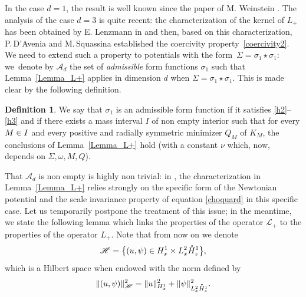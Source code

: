 \documentclass[10pt]{amsart}
\theoremstyle{definition}
\newtheorem{defin}[lemma]{Definition}
\newcommand*{\overbigdot}[1]{%
\accentset{\mbox{\large\bfseries .}}{#1}}
\begin{document}
In the case $d=1$, the result is well known since the paper of M. Weinstein \cite{Weinstein1}. The analysis of the case $d=3$ is quite recent: the characterization of the kernel of $L_{+}$ has been obtained by E. Lenzmann in \cite[Th.\,4]{Lenzmann} and then, based on this characterization, P.\,D'Avenia and M.\,Squassina \cite[Lem.\,2.7]{Avenia_Squassina} established the coercivity property~\eqref{coercivity2}.
We need to extend such a property to potentials with the form~\hbox{$\Sigma=\sigma_{1}\star\sigma_{1}$}:
we~\hbox{denote} by $\mathscr{A}_{d}$ the set of \emph{admissible} form functions
$\sigma_{1}$ such that Lemma~\ref{Lemma_L+} applies in dimension $d$ when $\Sigma=\sigma_{1}\star\sigma_{1}$.
This is made clear by the following definition.

\begin{defin}\label{d:adm}
We say that $\sigma_{1}$ is an admissible form function if it satisfies \eqref{h2}--\eqref{h3} and if there exists a mass interval $I$ of non empty interior such that for every $M\in\nobreak I$ and every positive and radially symmetric minimizer $Q_{M}$ of $K_{M}$,
the conclusions of
Lemma~\ref{Lemma_L+} hold (with a constant $\nu$ which, now, depends on $\Sigma, \omega, M, Q$).
\end{defin}

That $\mathscr{A}_{d}$ is non empty is highly non trivial: in \cite{Lenzmann}, the characterization in Lemma~\ref{Lemma_L+} relies strongly
on the specific form of the Newtonian potential and the scale invariance property of equation \eqref{choquard} in this specific case. Let us temporarily postpone the treatment of this issue; in the meantime, we
state the following lemma which links the properties of the operator $\mathcal{L}_{+}$ to the properties of the operator $L_{+}$. Note that from now on we denote
\[
\mathscr{H}=\bigl \{(u,\psi) \in H_{x}^{1}\times L_{x}^{2}\overbigdot{H}_{z}^{1}\bigr\},
\]
which is a Hilbert space when endowed with the norm defined by
\[
\|(u,\psi) \|_{\mathscr{H}}^{2}=\|u\|_{H_{x}^{1}}^{2}+\|\psi\|_{L_{x}^{2}\overbigdot{H}_{z}^{1}}^{2}.
\]
\end{document}
